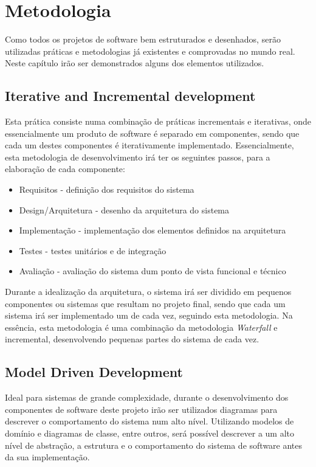 \chapter{Metodologia}

Como todos os projetos de software bem estruturados e desenhados, serão utilizadas práticas e metodologias já existentes e comprovadas no mundo real. Neste capítulo irão ser demonstrados alguns dos elementos utilizados.

\section{Iterative and Incremental development}

Esta prática consiste numa combinação de práticas incrementais e iterativas, onde essencialmente um produto de software é separado em componentes, sendo que cada um destes componentes é iterativamente implementado. Essencialmente, esta metodologia de desenvolvimento irá ter os seguintes passos, para a elaboração de cada componente:
\begin{itemize}
    \item Requisitos - definição dos requisitos do sistema
    \item Design/Arquitetura - desenho da arquitetura do sistema
    \item Implementação - implementação dos elementos definidos na arquitetura
    \item Testes - testes unitários e de integração
    \item Avaliação - avaliação do sistema dum ponto de vista funcional e técnico
\end{itemize}

Durante a idealização da arquitetura, o sistema irá ser dividido em pequenos componentes ou sistemas que resultam no projeto final, sendo que cada um sistema irá ser implementado um de cada vez, seguindo esta metodologia. Na essência, esta metodologia é uma combinação da metodologia \textit{Waterfall} e incremental, desenvolvendo pequenas partes do sistema de cada vez.

\section{Model Driven Development}

Ideal para sistemas de grande complexidade, durante o desenvolvimento dos componentes de software deste projeto irão ser utilizados diagramas para descrever o comportamento do sistema num alto nível. Utilizando modelos de domínio e diagramas de classe, entre outros, será possível descrever a um alto nível de abstração, a estrutura e o comportamento do sistema de software antes da sua implementação.

